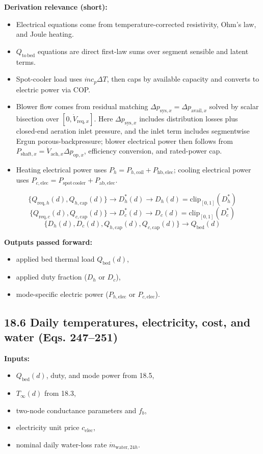 \documentclass[11pt]{article}
\begin{document}
\textbf{Derivation relevance (short):}
\begin{itemize}[leftmargin=*]
\item Electrical equations come from temperature-corrected resistivity, Ohm's law, and Joule heating.
\item \(Q_{\mathrm{to\,bed}}\) equations are direct first-law sums over segment sensible and latent terms.
\item Spot-cooler load uses \(\dot m c_p \Delta T\), then caps by available capacity and converts to electric power via COP.
\item Blower flow comes from residual matching \(\Delta p_{\mathrm{sys},x}=\Delta p_{\mathrm{avail},x}\) solved by scalar bisection over \([0,\dot V_{\mathrm{req},x}]\). Here \(\Delta p_{\mathrm{sys},x}\) includes distribution losses plus closed-end aeration inlet pressure, and the inlet term includes segmentwise Ergun porous-backpressure; blower electrical power then follows from \(P_{\mathrm{shaft},x}=\dot V_{\mathrm{ach},x}\Delta p_{\mathrm{op},x}\), efficiency conversion, and rated-power cap.
\item Heating electrical power uses \(P_h=P_{h,\mathrm{coil}}+P_{\mathrm{hb},\mathrm{elec}}\); cooling electrical power uses \(P_{c,\mathrm{elec}}=P_{\mathrm{spot\,cooler}}+P_{\mathrm{ab},\mathrm{elec}}\).
\end{itemize}
\[
\{Q_{\mathrm{req},h}(d),Q_{h,\mathrm{cap}}(d)\}
\rightarrow
D_h^*(d)
\rightarrow
D_h(d)=\mathrm{clip}_{[0,1]}(D_h^*)
\]
\[
\{Q_{\mathrm{req},c}(d),Q_{c,\mathrm{cap}}(d)\}
\rightarrow
D_c^*(d)
\rightarrow
D_c(d)=\mathrm{clip}_{[0,1]}(D_c^*)
\]
\[
\{D_h(d),D_c(d),Q_{h,\mathrm{cap}}(d),Q_{c,\mathrm{cap}}(d)\}
\rightarrow
Q_{\mathrm{bed}}(d)
\]

\textbf{Outputs passed forward:}
\begin{itemize}[leftmargin=*]
\item applied bed thermal load \(Q_{\mathrm{bed}}(d)\),
\item applied duty fraction (\(D_h\) or \(D_c\)),
\item mode-specific electric power (\(P_{h,\mathrm{elec}}\) or \(P_{c,\mathrm{elec}}\)).
\end{itemize}

\subsection*{18.6 Daily temperatures, electricity, cost, and water (Eqs. 247--251)}
\textbf{Inputs:}
\begin{itemize}[leftmargin=*]
\item \(Q_{\mathrm{bed}}(d)\), duty, and mode power from 18.5,
\item \(T_{\infty}(d)\) from 18.3,
\item two-node conductance parameters and \(f_b\),
\item electricity unit price \(c_{\mathrm{elec}}\),
\item nominal daily water-loss rate \(\dot m_{\mathrm{water},24h}\).
\end{itemize}
\end{document}
